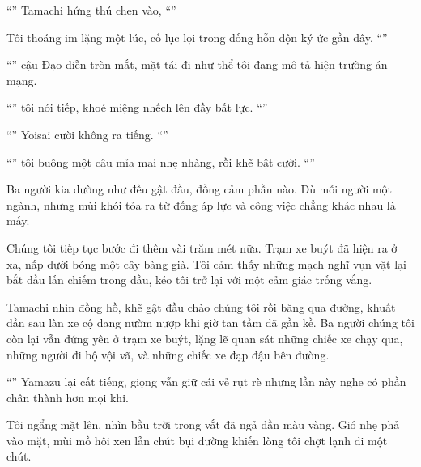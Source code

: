 \documentclass[../main.tex]{subfiles}
\begin{document}
``'' Tamachi hứng thú chen vào, ``''

Tôi thoáng im lặng một lúc, cố lục lọi trong đống hỗn độn ký ức gần đây. ``''

``'' cậu Đạo diễn tròn mắt, mặt tái đi như thể tôi đang mô tả hiện trường án mạng.

``'' tôi nói tiếp, khoé miệng nhếch lên đầy bất lực. ``''

``'' Yoisai cười không ra tiếng. ``''

``'' tôi buông một câu mỉa mai nhẹ nhàng, rồi khẽ bật cười. ``''

Ba người kia dường như đều gật đầu, đồng cảm phần nào. Dù mỗi người một ngành, nhưng mùi khói tỏa ra từ đống áp lực và công việc chẳng khác nhau là mấy.

Chúng tôi tiếp tục bước đi thêm vài trăm mét nữa. Trạm xe buýt đã hiện ra ở xa, nấp dưới bóng một cây bàng già. Tôi cảm thấy những mạch nghĩ vụn vặt lại bắt đầu lấn chiếm trong đầu, kéo tôi trở lại với một cảm giác trống vắng.

Tamachi nhìn đồng hồ, khẽ gật đầu chào chúng tôi rồi băng qua đường, khuất dần sau làn xe cộ đang nườm nượp khi giờ tan tầm đã gần kề. Ba người chúng tôi còn lại vẫn đứng yên ở trạm xe buýt, lặng lẽ quan sát những chiếc xe chạy qua, những người đi bộ vội vã, và những chiếc xe đạp đậu bên đường.

``'' Yamazu lại cất tiếng, giọng vẫn giữ cái vẻ rụt rè nhưng lần này nghe có phần chân thành hơn mọi khi.

Tôi ngẩng mặt lên, nhìn bầu trời trong vắt đã ngả dần màu vàng. Gió nhẹ phả vào mặt, mùi mồ hôi xen lẫn chút bụi đường khiến lòng tôi chợt lạnh đi một chút.
\end{document}
